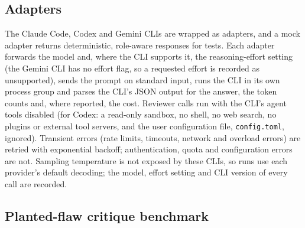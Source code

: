 \subsection*{Adapters}

The Claude Code, Codex and Gemini CLIs are wrapped as adapters, and a mock adapter returns deterministic, role-aware responses for tests. Each adapter forwards the model and, where the CLI supports it, the reasoning-effort setting (the Gemini CLI has no effort flag, so a requested effort is recorded as unsupported), sends the prompt on standard input, runs the CLI in its own process group and parses the CLI's JSON output for the answer, the token counts and, where reported, the cost. Reviewer calls run with the CLI's agent tools disabled (for Codex: a read-only sandbox, no shell, no web search, no plugins or external tool servers, and the user configuration file, \texttt{config.toml}, ignored). Transient errors (rate limits, timeouts, network and overload errors) are retried with exponential backoff; authentication, quota and configuration errors are not. Sampling temperature is not exposed by these CLIs, so runs use each provider's default decoding; the model, effort setting and CLI version of every call are recorded.

\subsection*{Planted-flaw critique benchmark}

